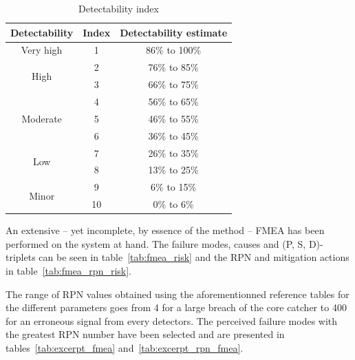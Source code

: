 \begin{table}[!htb]
    \centering
        \begin{tabular}{ ccc }
        \hline
        Detectability & Index & Detectability estimate \\ \hline\hline
        Very high                   & 1  & 86\% to 100\% \\
        \multirow{2}{*}{High}       & 2  & 76\% to 85\% \\
                                    & 3  & 66\% to 75\% \\
        \multirow{3}{*}{Moderate}   & 4  & 56\% to 65\% \\
                                    & 5  & 46\% to 55\%\\
                                    & 6  & 36\% to 45\% \\
        \multirow{2}{*}{Low}        & 7  & 26\% to 35\% \\
                                    & 8  & 13\% to 25\%\\
        \multirow{2}{*}{Minor}      & 9  & 6\% to 15\% \\
                                    & 10 & 0\% to 6\% \\
                                     
        \end{tabular}
        \caption{Detectability index}\label{tab:detectability}
\end{table}

An extensive -- yet incomplete, by essence of the method -- FMEA has been performed on the system at hand. The failure modes, causes and (P, S, D)-triplets can be seen in table~\ref{tab:fmea_risk} and the RPN and mitigation actions in table~\ref{tab:fmea_rpn_risk}.

The range of RPN values obtained using the aforementionned reference tables for the different parameters goes from 4 for a large breach of the core catcher to 400 for an erroneous signal from every detectors. The perceived failure modes with the greatest RPN number have been selected and are presented in tables~\ref{tab:excerpt_fmea} and~\ref{tab:excerpt_rpn_fmea}.

